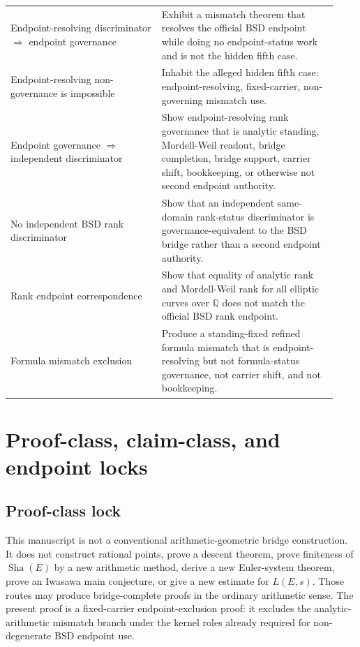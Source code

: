 \documentclass[11pt]{article}
\newcommand{\Q}{\mathbb{Q}}
\newcommand{\Sha}{\operatorname{Sha}}
\begin{document}
\begin{longtable}{L{0.43\linewidth}L{0.50\linewidth}}
Endpoint-resolving discriminator $\Rightarrow$ endpoint governance & Exhibit a mismatch theorem that resolves the official BSD endpoint while doing no endpoint-status work and is not the hidden fifth case.\\
Endpoint-resolving non-governance is impossible & Inhabit the alleged hidden fifth case: endpoint-resolving, fixed-carrier, non-governing mismatch use.\\
Endpoint governance $\Rightarrow$ independent discriminator & Show endpoint-resolving rank governance that is analytic standing, Mordell-Weil readout, bridge completion, bridge support, carrier shift, bookkeeping, or otherwise not second endpoint authority.\\
No independent BSD rank discriminator & Show that an independent same-domain rank-status discriminator is governance-equivalent to the BSD bridge rather than a second endpoint authority.\\
Rank endpoint correspondence & Show that equality of analytic rank and Mordell-Weil rank for all elliptic curves over $\Q$ does not match the official BSD rank endpoint.\\
Formula mismatch exclusion & Produce a standing-fixed refined formula mismatch that is endpoint-resolving but not formula-status governance, not carrier shift, and not bookkeeping.\\
\bottomrule
\end{longtable}

\newpage

\section{Proof-class, claim-class, and endpoint locks}

\subsection{Proof-class lock}
This manuscript is not a conventional arithmetic-geometric bridge construction. It does not construct rational points, prove a descent theorem, prove finiteness of $\Sha(E)$ by a new arithmetic method, derive a new Euler-system theorem, prove an Iwasawa main conjecture, or give a new estimate for $L(E,s)$. Those routes may produce bridge-complete proofs in the ordinary arithmetic sense. The present proof is a fixed-carrier endpoint-exclusion proof: it excludes the analytic-arithmetic mismatch branch under the kernel roles already required for non-degenerate BSD endpoint use.
\end{document}
